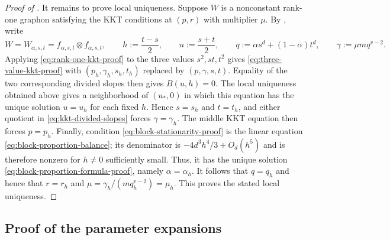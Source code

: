 \begin{proof}[Proof of ]
It remains to prove local uniqueness.
Suppose $W$ is a nonconstant rank-one graphon satisfying the KKT conditions at
$(p,r)$ with multiplier $\mu$.
By , write
\[
  W = W_{\alpha,s,t} = f_{\alpha,s,t}\otimes f_{\alpha,s,t},
  \qquad
  h:=\frac{t-s}{2},
  \qquad
  u:=\frac{s+t}{2},
  \qquad
  q:=\alpha s^d+(1-\alpha)t^d,
  \qquad
  \gamma:=\mu m q^{v-2}.
\]
Applying \eqref{eq:rank-one-kkt-proof} to the three values
$s^2,st,t^2$ gives \eqref{eq:three-value-kkt-proof} with
$(p_h,\gamma_h,s_h,t_h)$ replaced by $(p,\gamma,s,t)$.  Equality of the two
corresponding divided slopes then gives $B(u,h)=0$.  The local uniqueness
obtained above gives a neighborhood
of $(u_*,0)$ in which this equation has the unique solution $u=u_h$ for each
fixed $h$.  Hence $s=s_h$ and $t=t_h$, and either quotient in
\eqref{eq:kkt-divided-slopes} forces $\gamma=\gamma_h$.  The
middle KKT equation then forces $p=p_h$.  Finally,
condition \eqref{eq:block-stationarity-proof} is the linear equation
\eqref{eq:block-proportion-balance}; its denominator is
$-4d^3h^4/3+O_d(h^5)$ and is therefore nonzero for $h\ne0$ sufficiently small.
Thus, it has the unique solution \eqref{eq:block-proportion-formula-proof}, namely
$\alpha=\alpha_h$.  It follows that $q=q_h$ and hence that $r=r_h$ and
$\mu=\gamma_h/(m q_h^{v-2})=\mu_h$.  This proves the stated local uniqueness.
\end{proof}

\subsection{Proof of the parameter expansions}
\label{app:rank-one-parameter-expansions}

